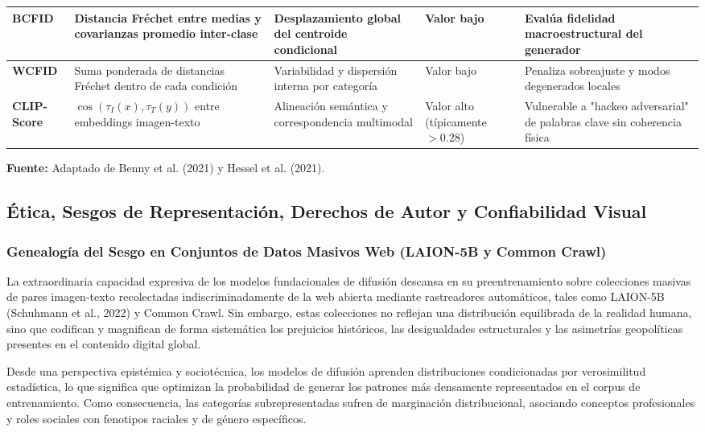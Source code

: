 \begin{table}[htpb!]
{\begin{tabularx}{\textwidth}{>{\bfseries}p{1.5cm} >{\raggedright\arraybackslash}p{4.0cm} >{\raggedright\arraybackslash}p{2.8cm} >{\raggedright\arraybackslash}p{2.6cm} >{\raggedright\arraybackslash}X}
\midrule
BCFID & Distancia Fréchet entre medias y covarianzas promedio inter-clase & Desplazamiento global del centroide condicional & Valor bajo & Evalúa fidelidad macroestructural del generador \\
\midrule
WCFID & Suma ponderada de distancias Fréchet dentro de cada condición & Variabilidad y dispersión interna por categoría & Valor bajo & Penaliza sobreajuste y modos degenerados locales \\
\midrule
CLIP-Score & $\cos(\tau_I(x), \tau_T(y))$ entre embeddings imagen-texto & Alineación semántica y correspondencia multimodal & Valor alto (típicamente $>0.28$) & Vulnerable a "hackeo adversarial" de palabras clave sin coherencia física \\
\bottomrule
\end{tabularx}%
}
\vspace{0.25cm}
{\scriptsize \textbf{Fuente:} Adaptado de Benny et al. (2021) y Hessel et al. (2021).}
\end{table}

\subsection{Ética, Sesgos de Representación, Derechos de Autor y Confiabilidad Visual}

\subsubsection{Genealogía del Sesgo en Conjuntos de Datos Masivos Web (LAION-5B y Common Crawl)}

La extraordinaria capacidad expresiva de los modelos fundacionales de difusión descansa en su preentrenamiento sobre colecciones masivas de pares imagen-texto recolectadas indiscriminadamente de la web abierta mediante rastreadores automáticos, tales como LAION-5B (Schuhmann et al., 2022) y Common Crawl. Sin embargo, estas colecciones no reflejan una distribución equilibrada de la realidad humana, sino que codifican y magnifican de forma sistemática los prejuicios históricos, las desigualdades estructurales y las asimetrías geopolíticas presentes en el contenido digital global.

Desde una perspectiva epistémica y sociotécnica, los modelos de difusión aprenden distribuciones condicionadas por verosimilitud estadística, lo que significa que optimizan la probabilidad de generar los patrones más densamente representados en el corpus de entrenamiento. Como consecuencia, las categorías subrepresentadas sufren de marginación distribucional, asociando conceptos profesionales y roles sociales con fenotipos raciales y de género específicos.

